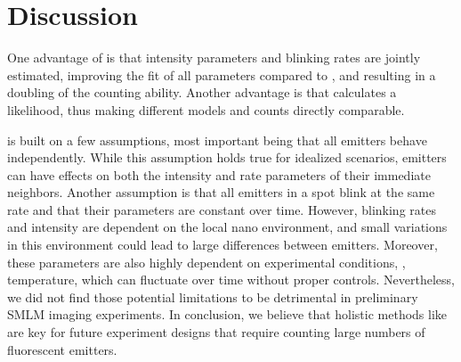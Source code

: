 \section{Discussion}

One advantage of \ours is that intensity parameters and blinking rates are jointly estimated, improving the fit of all parameters compared to \lbfcs, and resulting in a doubling of the counting ability. 
%
Another advantage is that \ours calculates a likelihood, thus making different models and counts directly comparable. 
%

\ours is built on a few assumptions, most important being that all emitters behave independently. While this assumption holds true for idealized scenarios, emitters can have effects on both the intensity and rate parameters of their immediate neighbors.
%
Another assumption is that all emitters in a spot blink at the same rate and that their parameters are constant over time. However, blinking rates and intensity are dependent on the local nano environment, and small variations in this environment could lead to large differences between emitters.
%
Moreover, these parameters are also highly dependent on experimental conditions, \ie, temperature, which can fluctuate over time without proper controls.
%
Nevertheless, we did not find those potential limitations to be detrimental in
preliminary SMLM imaging experiments.
%
In conclusion, we believe that holistic methods like \ours are key for future
experiment designs that require counting large numbers of fluorescent emitters.
